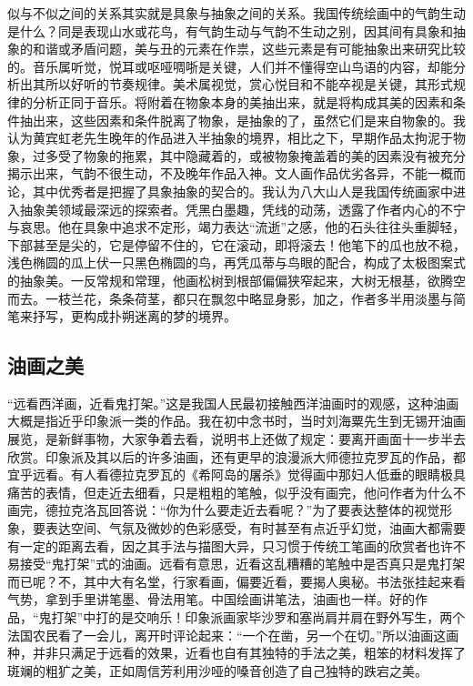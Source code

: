 \documentclass{article}
\begin{document}
似与不似之间的关系其实就是具象与抽象之间的关系。我国传统绘画中的气韵生动是什么？同是表现山水或花鸟，有气韵生动与气韵不生动之别，因其间有具象和抽象的和谐或矛盾问题，美与丑的元素在作祟，这些元素是有可能抽象出来研究比较的。音乐属听觉，悦耳或呕哑啁哳是关键，人们并不懂得空山鸟语的内容，却能分析出其所以好听的节奏规律。美术属视觉，赏心悦目和不能卒视是关键，其形式规律的分析正同于音乐。将附着在物象本身的美抽出来，就是将构成其美的因素和条件抽出来，这些因素和条件脱离了物象，是抽象的了，虽然它们是来自物象的。我认为黄宾虹老先生晚年的作品进入半抽象的境界，相比之下，早期作品太拘泥于物象，过多受了物象的拖累，其中隐藏着的，或被物象掩盖着的美的因素没有被充分揭示出来，气韵不很生动，不及晚年作品入神。文人画作品优劣各异，不能一概而论，其中优秀者是把握了具象抽象的契合的。我认为八大山人是我国传统画家中进入抽象美领域最深远的探索者。凭黑白墨趣，凭线的动荡，透露了作者内心的不宁与哀思。他在具象中追求不定形，竭力表达“流逝”之感，他的石头往往头重脚轻，下部甚至是尖的，它是停留不住的，它在滚动，即将滚去！他笔下的瓜也放不稳，浅色椭圆的瓜上伏一只黑色椭圆的鸟，再凭瓜蒂与鸟眼的配合，构成了太极图案式的抽象美。一反常规和常理，他画松树到根部偏偏狭窄起来，大树无根基，欲腾空而去。一枝兰花，条条荷茎，都只在飘忽中略显身影，加之，作者多半用淡墨与简笔来抒写，更构成扑朔迷离的梦的境界。
\subsection{油画之美}
“远看西洋画，近看鬼打架。”这是我国人民最初接触西洋油画时的观感，这种油画大概是指近乎印象派一类的作品。我在初中念书时，当时刘海粟先生到无锡开油画展览，是新鲜事物，大家争着去看，说明书上还做了规定：要离开画面十一步半去欣赏。印象派及其以后的许多油画，还有更早的浪漫派大师德拉克罗瓦的作品，都宜乎远看。有人看德拉克罗瓦的《希阿岛的屠杀》觉得画中那妇人低垂的眼睛极具痛苦的表情，但走近去细看，只是粗粗的笔触，似乎没有画完，他问作者为什么不画完，德拉克洛瓦回答说：“你为什么要走近去看呢？”为了要表达整体的视觉形象，要表达空间、气氛及微妙的色彩感受，有时甚至有点近乎幻觉，油画大都需要有一定的距离去看，因之其手法与描图大异，只习惯于传统工笔画的欣赏者也许不易接受“鬼打架”式的油画。远看有意思，近看这乱糟糟的笔触中是否真只是鬼打架而已呢？不，其中大有名堂，行家看画，偏要近看，要揭人奥秘。书法张挂起来看气势，拿到手里讲笔墨、骨法用笔。中国绘画讲笔法，油画也一样。好的作品，“鬼打架”中打的是交响乐！印象派画家毕沙罗和塞尚肩并肩在野外写生，两个法国农民看了一会儿，离开时评论起来：“一个在凿，另一个在切。”所以油画这画种，并非只满足于远看的效果，近看也自有其独特的手法之美，粗笨的材料发挥了斑斓的粗犷之美，正如周信芳利用沙哑的嗓音创造了自己独特的跌宕之美。
\end{document}
